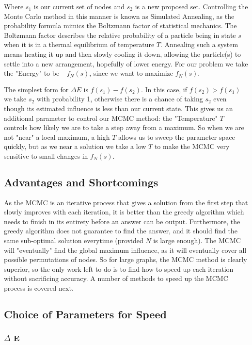 \documentclass{article}
\begin{document}
		Where $s_1$ is our current set of nodes and $s_2$ is a new proposed set. Controlling the Monte Carlo method in this manner is known as Simulated Annealing, as the probability formula mimics the Boltzmann factor of statistical mechanics. The Boltzmann factor describes the relative probability of a particle being in state $s$ when it is in a thermal equilibrium of temperature $T$. Annealing such a system means heating it up and then slowly cooling it down, allowing the particle(s) to settle into a new arrangement, hopefully of lower energy. For our problem we take the "Energy" to be $-f_N(s)$, since we want to maximize $f_N(s)$. 
		
		The simplest form for $\Delta E$ is $f(s_1) - f(s_2)$. In this case, if $f(s_2) > f(s_1)$ we take $s_2$ with probability 1, otherwise there is a chance of taking $s_2$ even though its estimated influence is less than our current state. This gives us an additional parameter to control our MCMC method: the "Temperature" $T$ controls how likely we are to take a step away from a maximum. So when we are not "near" a local maximum, a high $T$ allows us to sweep the parameter space quickly, but as we near a solution we take a low $T$ to make the MCMC very sensitive to small changes in $f_N(s)$.
	
	\subsection{Advantages and Shortcomings}
	
	As the MCMC is an iterative process that gives a solution from the first step that slowly improves with each iteration, it is better than the greedy algorithm which needs to finish in its entirety before an answer can be output. Furthermore, the greedy algorithm does not guarantee to find the answer, and it should find the same sub-optimal solution everytime (provided $N$ is large enough). The MCMC will "eventually" find the global maximum influence, as it will eventually cover all possible permutations of nodes. So for large graphs, the MCMC method is clearly superior, so the only work left to do is to find how to speed up each iteration without sacrificing accuracy. A number of methods to speed up the MCMC process is covered next.
	
	\subsection{Choice of Parameters for Speed}
	
	\subsubsection{$\Delta$ E}
	
\end{document}
